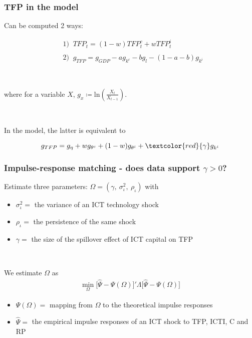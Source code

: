 \documentclass{beamer}
\begin{document}
\begin{frame}
	\frametitle{TFP in the model}

Can be computed 2 ways:

\begin{align*}
&1) \;\; TFP_t = (1 - w) TFP_t^c + w TFP_t^i \\
\\
& 2) \;\; g_{TFP} = g_{GDP} - a g_{k^c} -b g_{l} - (1-a-b)g_{k^i}
\end{align*}

\

where for a variable $X$, $g_x \coloneqq \text{ln}\left(\frac{X_t}{X_{t-1}}\right)$.

\

In the model, the latter is equivalent to

\begin{equation}
g_{TFP} = g_{\eta} + wg_{\theta^c} + (1-w)g_{\theta^i} +\textcolor{red}{\gamma}  g_{k^i}
\end{equation}



\end{frame}

\begin{frame}
	\frametitle{Impulse-response matching - does data support $\gamma>0$?}
	
Estimate three parameters: $\Omega = (\gamma, \ \sigma_{\iota}^2, \ \rho_{\iota})$ with

\begin{itemize}
\item $\sigma_{\iota}^2 =$ the variance of an ICT technology shock
\item $\rho_{\iota}=$ the persistence of the same shock
\item $\gamma=$  the size of the spillover effect of ICT capital on TFP
\end{itemize}


\

We estimate $\Omega$ as
\begin{eqnarray}\label{equation:min_prob_IRmatching}
\min_{\Omega} \big[  \hat{\Psi} - \Psi(\Omega)  \big]' \Lambda \big[  \hat{\Psi} - \Psi(\Omega)  \big]
\end{eqnarray}

\begin{itemize}
\item $\Psi(\Omega) =$ mapping from $\Omega$ to the theoretical impulse responses
\item $\hat{\Psi} =$ the empirical impulse responses of an ICT shock to TFP, ICTI, C and RP
\end{itemize}

\end{frame}
\end{document}
